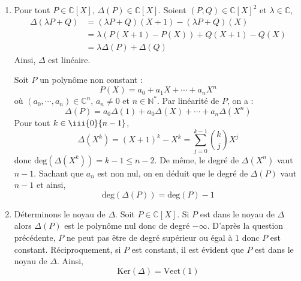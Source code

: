 \documentclass[a4paper,twoside,french,11pt]{VcCours}
\begin{document}
\begin{enumerate}
\item Pour tout $P \in \mathbb{C}[X]$, $\Delta(P) \in \mathbb{C}[X]$. Soient $(P,Q) \in \mathbb{C}[X]^2$ et $\lambda \in \mathbb{C}$,
\begin{align*}
\Delta(\lambda P +Q) & = (\lambda P+Q)(X+1) - (\lambda P +Q)(X) \\
& = \lambda (P(X+1)-P(X)) + Q(X+1)-Q(X) \\
& = \lambda \Delta(P) + \Delta(Q)
\end{align*}
Ainsi, $\Delta$ est linéaire.



\noindent Soit $P$ un polynôme non constant :
$$ P(X) = a_0 + a_1 X + \cdots + a_n X^n$$
où $(a_0, \cdots, a_n) \in \mathbb{C}^n$, $a_n \neq 0$ et $n \in \mathbb{N}^*$. Par linéarité de $P$, on a :
$$ \Delta(P) = a_0 \Delta(1)+ a_0 \Delta(X) + \cdots + a_n \Delta(X^n)$$
Pour tout $k \in \iii{0}{n-1}$,
$$ \Delta(X^k) = (X+1)^k - X^k = \sum_{j=0}^{k-1} \binom{k}{j} X^j$$
donc $\textrm{deg}(\Delta(X^k))=k-1 \leq n-2$. De même, le degré de $\Delta(X^n)$ vaut $n-1$. Sachant que $a_n$ est non nul, on en déduit que le degré de $\Delta(P)$ vaut $n-1$ et ainsi,
$$ \textrm{deg}(\Delta(P)) = \textrm{deg}(P)-1$$
\item Déterminons le noyau de $\Delta$. Soit $P \in \mathbb{C}[X]$. Si $P$ est dans le noyau de $\Delta$ alors $\Delta(P)$ est le polynôme nul donc de degré $- \infty$. D'après la question précédente, $P$ ne peut pas être de degré supérieur ou égal à $1$ donc $P$ est constant. Réciproquement, si $P$ est constant, il est évident que $P$ est dans le noyau de $\Delta$. Ainsi,
$$ \textrm{Ker}(\Delta) = \textrm{Vect}(1)$$


\end{enumerate}
\end{document}
